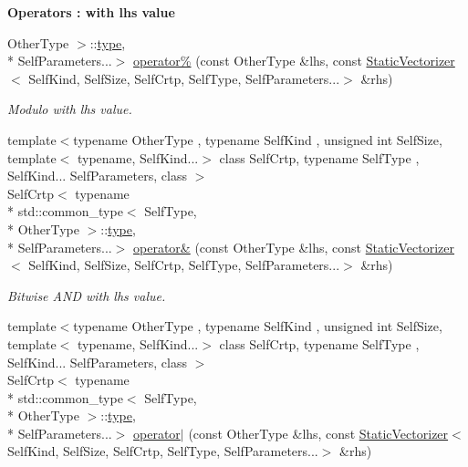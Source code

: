 \begin{Indent}{\bf Operators \-: with lhs value}
\begin{DoxyCompactItemize}
Other\-Type $>$\-::\hyperlink{classmagrathea_1_1StaticVectorizer_a28c393a3896a3e839008c35d56b10a54}{type}, \\*
Self\-Parameters...$>$ \hyperlink{classmagrathea_1_1StaticVectorizer_aa5662ba4d3f881341cc797968af9fa41}{operator\%} (const Other\-Type \&lhs, const \hyperlink{classmagrathea_1_1StaticVectorizer}{Static\-Vectorizer}$<$ Self\-Kind, Self\-Size, Self\-Crtp, Self\-Type, Self\-Parameters...$>$ \&rhs)
\begin{DoxyCompactList}\small\item\em Modulo with lhs value. \end{DoxyCompactList}\item 
{\footnotesize template$<$typename Other\-Type , typename Self\-Kind , unsigned int Self\-Size, template$<$ typename, Self\-Kind...$>$ class Self\-Crtp, typename Self\-Type , Self\-Kind... Self\-Parameters, class $>$ }\\Self\-Crtp$<$ typename \\*
std\-::common\-\_\-type$<$ Self\-Type, \\*
Other\-Type $>$\-::\hyperlink{classmagrathea_1_1StaticVectorizer_a28c393a3896a3e839008c35d56b10a54}{type}, \\*
Self\-Parameters...$>$ \hyperlink{classmagrathea_1_1StaticVectorizer_afca1e5aa41c2048a2543030ce7456354}{operator\&} (const Other\-Type \&lhs, const \hyperlink{classmagrathea_1_1StaticVectorizer}{Static\-Vectorizer}$<$ Self\-Kind, Self\-Size, Self\-Crtp, Self\-Type, Self\-Parameters...$>$ \&rhs)
\begin{DoxyCompactList}\small\item\em Bitwise A\-N\-D with lhs value. \end{DoxyCompactList}\item 
{\footnotesize template$<$typename Other\-Type , typename Self\-Kind , unsigned int Self\-Size, template$<$ typename, Self\-Kind...$>$ class Self\-Crtp, typename Self\-Type , Self\-Kind... Self\-Parameters, class $>$ }\\Self\-Crtp$<$ typename \\*
std\-::common\-\_\-type$<$ Self\-Type, \\*
Other\-Type $>$\-::\hyperlink{classmagrathea_1_1StaticVectorizer_a28c393a3896a3e839008c35d56b10a54}{type}, \\*
Self\-Parameters...$>$ \hyperlink{classmagrathea_1_1StaticVectorizer_af8c589260c56e0aa83231d668b5b8bf8}{operator$|$} (const Other\-Type \&lhs, const \hyperlink{classmagrathea_1_1StaticVectorizer}{Static\-Vectorizer}$<$ Self\-Kind, Self\-Size, Self\-Crtp, Self\-Type, Self\-Parameters...$>$ \&rhs)

\end{DoxyCompactItemize}
\end{Indent}
